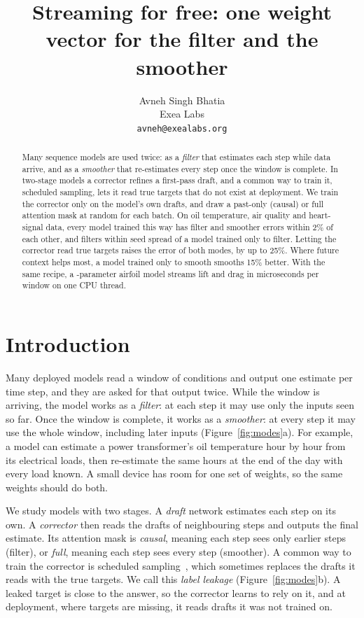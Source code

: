 \documentclass{article}
\author{Avneh Singh Bhatia\\ Exea Labs\\ \texttt{avneh@exealabs.org}}
\title{Streaming for free: one weight vector for the filter and the smoother}
\begin{document}
\maketitle

\begin{abstract}
Many sequence models are used twice: as a \emph{filter} that estimates each step while data arrive, and as a \emph{smoother} that re-estimates every step once the window is complete. In two-stage models a corrector refines a first-pass draft, and a common way to train it, scheduled sampling, lets it read true targets that do not exist at deployment. We train the corrector only on the model's own drafts, and draw a past-only (causal) or full attention mask at random for each batch. On oil temperature, air quality and heart-signal data, every model trained this way has filter and smoother errors within 2\% of each other, and filters within seed spread of a model trained only to filter. Letting the corrector read true targets raises the error of both modes, by up to 25\%. Where future context helps most, a model trained only to smooth smooths 15\% better. With the same recipe, a \NParamsMain-parameter airfoil model streams lift and drag in \MainFusedUs{} microseconds per window on one CPU thread.
\end{abstract}

\section{Introduction}
\label{sec:intro}
Many deployed models read a window of conditions and output one estimate per time step, and they are asked for that output twice. While the window is arriving, the model works as a \emph{filter}: at each step it may use only the inputs seen so far. Once the window is complete, it works as a \emph{smoother}: at every step it may use the whole window, including later inputs (Figure~\ref{fig:modes}a). For example, a model can estimate a power transformer's oil temperature hour by hour from its electrical loads, then re-estimate the same hours at the end of the day with every load known. A small device has room for one set of weights, so the same weights should do both.

We study models with two stages. A \emph{draft} network estimates each step on its own. A \emph{corrector} then reads the drafts of neighbouring steps and outputs the final estimate. Its attention mask is \emph{causal}, meaning each step sees only earlier steps (filter), or \emph{full}, meaning each step sees every step (smoother). A common way to train the corrector is scheduled sampling~\citep{bengio2015scheduled}, which sometimes replaces the drafts it reads with the true targets. We call this \emph{label leakage} (Figure~\ref{fig:modes}b). A leaked target is close to the answer, so the corrector learns to rely on it, and at deployment, where targets are missing, it reads drafts it was not trained on.
\end{document}
